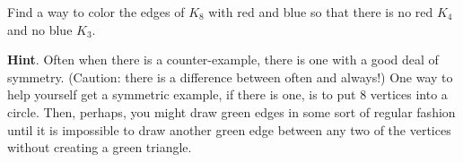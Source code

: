 \documentclass{book}
\begin{document}
\setcounter{cpjt}{50}
\addtocounter{cpjt}{-1}
\begin{activity}\label{activity-43}
\hypertarget{p-413}{}%
Find a way to color the edges of \(K_8\) with red and blue so that there is no red \(K_4\) and no blue \(K_3\).%
\par\smallskip%
\noindent\textbf{Hint}.\hypertarget{hint-20}{}\quad%
\hypertarget{p-414}{}%
Often when there is a counter-example, there is one with a good deal of symmetry. (Caution: there is a difference between often and always!) One way to help yourself get a symmetric example, if there is one, is to put 8 vertices into a circle. Then, perhaps, you might draw green edges in some sort of regular fashion until it is impossible to draw another green edge between any two of the vertices without creating a green triangle.%
\end{activity}

\clearpage
\end{document}
